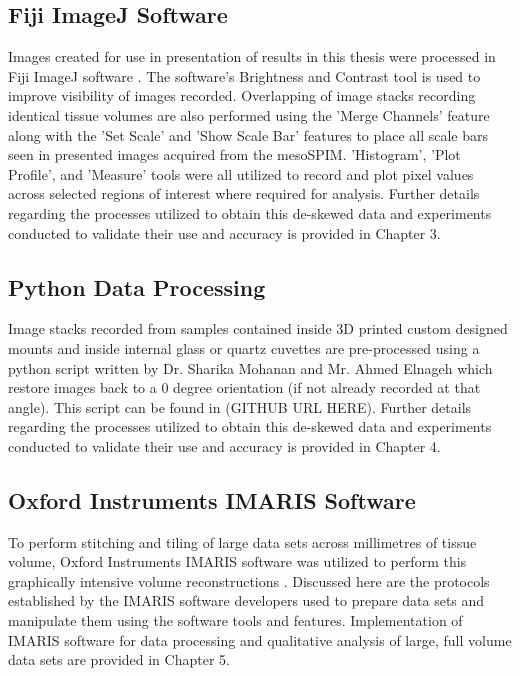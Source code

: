 \subsection{Fiji ImageJ Software}
Images created for use in presentation of results in this thesis were processed in Fiji ImageJ software \cite{schindelin_fiji_2012}. The software's Brightness and Contrast tool is used to improve visibility of images recorded. Overlapping of image stacks recording identical tissue volumes are also performed using the 'Merge Channels' feature along with the 'Set Scale' and 'Show Scale Bar' features to place all scale bars seen in presented images acquired from the mesoSPIM. 'Histogram', 'Plot Profile', and 'Measure' tools were all utilized to record and plot pixel values across selected regions of interest where required for analysis. Further details regarding the processes utilized to obtain this de-skewed data and experiments conducted to validate their use and accuracy is provided in Chapter 3.

\subsection{Python Data Processing}
Image stacks recorded from samples contained inside 3D printed custom designed mounts and inside internal glass or quartz cuvettes are pre-processed using a python script written by Dr. Sharika Mohanan and Mr. Ahmed Elnageh which restore images back to a 0 degree orientation (if not already recorded at that angle). This script can be found in (GITHUB URL HERE). Further details regarding the processes utilized to obtain this de-skewed data and experiments conducted to validate their use and accuracy is provided in Chapter 4.

\subsection{Oxford Instruments IMARIS Software}
To perform stitching and tiling of large data sets across millimetres of tissue volume, Oxford Instruments IMARIS software was utilized to perform this graphically intensive volume reconstructions \cite{mullan_imaris_nodate,noauthor_imaris_2024}. Discussed here are the protocols established by the IMARIS software developers used to prepare data sets and manipulate them using the software tools and features. Implementation of IMARIS software for data processing and qualitative analysis of large, full volume data sets are provided in Chapter 5.



